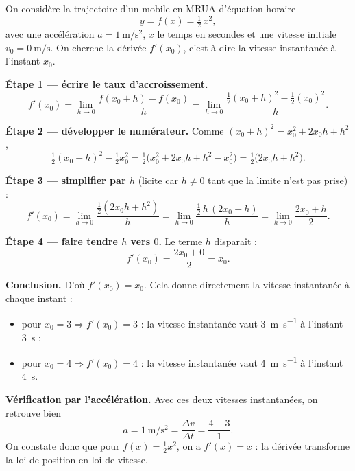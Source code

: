 \documentclass[11pt,a4paper]{article}
\newcommand{\limh}{\lim_{h\to 0}}
\begin{document}
\begin{exemple}
On considère la trajectoire d'un mobile en MRUA d'équation horaire
\[
   y=f(x)=\tfrac12\,x^2,
\]
avec une accélération $a=\qty{1}{\metre\per\second\squared}$, $x$ le temps en secondes et une vitesse
initiale $v_0=\qty{0}{\metre\per\second}$. On cherche la dérivée $f'(x_0)$, c'est-à-dire la vitesse
instantanée à l'instant $x_0$.

\medskip
\textbf{Étape 1 — écrire le taux d'accroissement.}
\[
   f'(x_0)=\limh\frac{f(x_0+h)-f(x_0)}{h}
          =\limh\frac{\tfrac12(x_0+h)^2-\tfrac12(x_0)^2}{h}.
\]

\textbf{Étape 2 — développer le numérateur.} Comme $(x_0+h)^2=x_0^2+2x_0h+h^2$,
\[
   \tfrac12(x_0+h)^2-\tfrac12 x_0^2
   =\tfrac12\big(x_0^2+2x_0h+h^2-x_0^2\big)
   =\tfrac12\big(2x_0h+h^2\big).
\]

\textbf{Étape 3 — simplifier par $h$} (licite car $h\neq 0$ tant que la limite n'est pas prise) :
\[
   f'(x_0)=\limh\frac{\tfrac12(2x_0h+h^2)}{h}
          =\limh\frac{\tfrac12\,h\,(2x_0+h)}{h}
          =\limh\frac{2x_0+h}{2}.
\]

\textbf{Étape 4 — faire tendre $h$ vers $0$.} Le terme $h$ disparaît :
\[
   f'(x_0)=\frac{2x_0+0}{2}=x_0.
\]

\textbf{Conclusion.} D'où $f'(x_0)=x_0$. Cela donne directement la vitesse instantanée à chaque instant :
\begin{itemize}[leftmargin=1.6em,topsep=2pt,itemsep=1pt]
  \item pour $x_0=3 \Rightarrow f'(x_0)=3$ : la vitesse instantanée vaut \qty{3}{\metre\per\second} à l'instant \qty{3}{\second} ;
  \item pour $x_0=4 \Rightarrow f'(x_0)=4$ : la vitesse instantanée vaut \qty{4}{\metre\per\second} à l'instant \qty{4}{\second}.
\end{itemize}

\textbf{Vérification par l'accélération.} Avec ces deux vitesses instantanées, on retrouve bien
\[
   a=\qty{1}{\metre\per\second\squared}=\frac{\Delta v}{\Delta t}=\frac{4-3}{1}.
\]
On constate donc que pour $f(x)=\tfrac12 x^2$, on a $f'(x)=x$ : la dérivée transforme la loi de
position en loi de vitesse.
\end{exemple}
\end{document}
